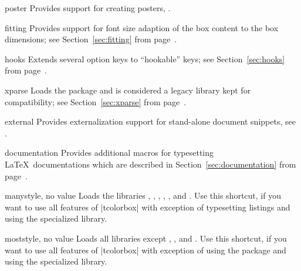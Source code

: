 {\begin{docTcbKey}[library]{poster}{}{}
  Provides support for creating posters, .
\end{docTcbKey}

\begin{docTcbKey}[library]{fitting}{}{}
  Provides support for font size adaption of the box content to
  the box dimensions;
  see Section~\ref{sec:fitting} from page~\pageref{sec:fitting}.
\end{docTcbKey}

\begin{docTcbKey}[library]{hooks}{}{}
  Extends several option keys to \enquote{hookable} keys;
  see Section~\ref{sec:hooks} from page~\pageref{sec:hooks}.
\end{docTcbKey}

\clearpage
\begin{docTcbKey}[library]{xparse}{}{}
  Loads the package  and is considered a legacy library kept for compatibility;
  see Section~\ref{sec:xparse} from page~\pageref{sec:xparse}.
\end{docTcbKey}

\begin{docTcbKey}[library]{external}{}{}
  Provides externalization support for stand-alone document snippets,
  see .
\end{docTcbKey}

\begin{docTcbKey}[library]{documentation}{}{}
  Provides additional
  macros for typesetting \LaTeX\ documentations
  which are described in Section~\ref{sec:documentation}
  from page~\pageref{sec:documentation}.
\end{docTcbKey}

\begin{docTcbKey}[library]{many}{}{style, no value}
  Loads the libraries , , , ,
  , and .
  Use this shortcut, if you want to use all features of |tcolorbox|
  with exception of typesetting listings and using
  the specialized  library.
\end{docTcbKey}

\begin{docTcbKey}[library]{most}{}{style, no value}
  Loads all libraries except , , and .
  Use this shortcut, if you want to use all features of |tcolorbox|
  with exception of using the  package and using
  the specialized  library.
\end{docTcbKey}

}
